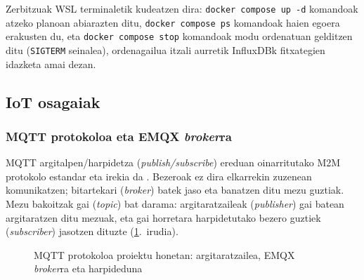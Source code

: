 \documentclass[10pt]{article}
\begin{document}
Zerbitzuak \ac{WSL} terminaletik kudeatzen dira: \texttt{docker compose up -d} komandoak atzeko planoan abiarazten ditu, \texttt{docker compose ps} komandoak haien egoera erakusten du, eta \texttt{docker compose stop} komandoak modu ordenatuan gelditzen ditu (\texttt{SIGTERM} seinalea), ordenagailua itzali aurretik InfluxDBk fitxategien idazketa amai dezan.\\

\subsection{\acs{IoT} osagaiak}

\subsubsection{\acs{MQTT} protokoloa eta EMQX \textit{broker}ra}
\label{sec:emqx}

\ac{MQTT} argitalpen/harpidetza (\textit{publish/subscribe}) ereduan oinarritutako \ac{M2M} protokolo estandar eta irekia da \cite{mqtt5}. Bezeroak ez dira elkarrekin zuzenean komunikatzen; bitartekari (\textit{broker}) batek jaso eta banatzen ditu mezu guztiak. Mezu bakoitzak gai (\textit{topic}) bat darama: argitaratzaileak (\textit{publisher}) gai batean argitaratzen ditu mezuak, eta gai horretara harpidetutako bezero guztiek (\textit{subscriber}) jasotzen dituzte (\ref{fig:mqttirudia}.~irudia).\\

\begin{figure}[!htbp]
\centering
{}
\caption{\acs{MQTT} protokoloa proiektu honetan: argitaratzailea, EMQX \textit{broker}ra eta harpideduna}
\label{fig:mqttirudia}
\end{figure}
\end{document}
